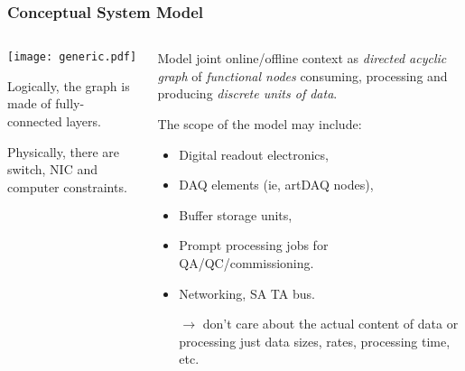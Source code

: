 \documentclass[xcolor=dvipsnames]{beamer}
\begin{document}
\begin{frame}
\end{frame}

\begin{frame}[fragile]
  \frametitle{Conceptual System Model}


  \begin{columns}
    \begin{column}{0.4\textwidth}
      \texttt{[image: generic.pdf]}      

      \scriptsize 

      Logically, the graph is made of fully-connected layers.

      Physically, there are switch, NIC and computer constraints.

    \end{column}
    \begin{column}{0.6\textwidth}
      Model joint online/offline context as \textit{directed acyclic graph} of
      \textit{functional nodes} consuming, processing and producing \textit{discrete units of data}.

      \vspace{2mm}

      The scope of the model may include:
      \begin{itemize}\footnotesize
      \item Digital readout electronics,
      \item DAQ elements (ie, artDAQ nodes),
      \item Buffer storage units,
      \item Prompt processing jobs for QA/QC/commissioning.
      \item Networking, SA TA bus.
      \item[$\rightarrow$] don't care about the actual content of data
        or processing just data sizes, rates, processing time, etc.
      \end{itemize}
      
    \end{column}
  \end{columns}


\end{frame}
\end{document}
